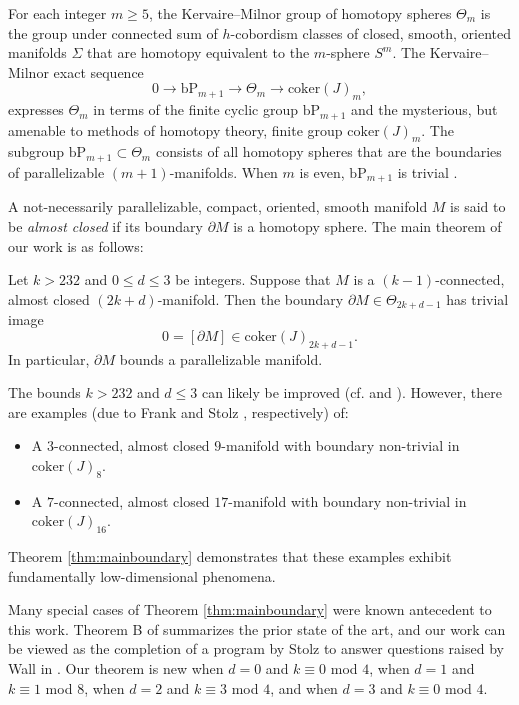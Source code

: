 For each integer $m \ge 5$, the Kervaire--Milnor \cite{KervaireMilnor} group of homotopy spheres $\Theta_{m}$ is the group under connected sum of $h$-cobordism classes of closed, smooth, oriented manifolds $\Sigma$ that are homotopy equivalent to the $m$-sphere $S^{m}$.  The Kervaire--Milnor exact sequence
$$0 \to \mathrm{bP}_{m+1} \to \Theta_{m} \to \mathrm{coker}(J)_{m},$$
expresses $\Theta_{m}$ in terms of the finite cyclic group $\mathrm{bP}_{m+1}$ and the mysterious, but amenable to methods of homotopy theory, finite group $\mathrm{coker}(J)_{m}$.  The subgroup $\mathrm{bP}_{m+1} \subset \Theta_{m}$ consists of all homotopy spheres that are the boundaries of parallelizable $(m+1)$-manifolds.  When $m$ is even, $\mathrm{bP}_{m+1}$ is trivial \cite[Theorem 5.1]{KervaireMilnor}.

A not-necessarily parallelizable, compact, oriented, smooth manifold $M$ is said to be \emph{almost closed} if its boundary $\partial M$ is a homotopy sphere.  The main theorem of our work is as follows:

\begin{thm} \label{thm:mainboundary}
Let $k>232$ and $0 \le d \le 3$ be integers.  Suppose that $M$ is a $(k-1)$-connected, almost closed $(2k+d)$-manifold.  Then the boundary 
$\partial M \in \Theta_{2k+d-1}$ has trivial image $$0=[\partial M] \in \mathrm{coker}(J)_{2k+d-1}.$$  In particular, $\partial M$ bounds a parallelizable manifold.
\end{thm}

\begin{rmk}
The bounds $k>232$ and $d \le 3$ can likely be improved (cf.  and ).  However, there are examples (due to Frank \cite[Example 1]{Frank} and Stolz \cite[Satz 12.1]{StolzBook}, respectively) of:
\begin{itemize}
 \item A $3$-connected, almost closed $9$-manifold with boundary non-trivial in $\mathrm{coker}(J)_8$.
 \item A $7$-connected, almost closed $17$-manifold with boundary non-trivial in $\mathrm{coker}(J)_{16}$.
\end{itemize}
Theorem \ref{thm:mainboundary} demonstrates that these examples exhibit fundamentally low-dimensional phenomena.
\end{rmk}

\begin{rmk}
Many special cases of Theorem \ref{thm:mainboundary} were known antecedent to this work. 
Theorem B of \cite{StolzBook} summarizes the prior state of the art, and our work can be viewed as the completion of a program by Stolz to answer questions raised by Wall in \cite{Wall62,Wall67}.  Our theorem is new when $d=0$ and $k \equiv 0$ mod $4$, when $d=1$ and $k \equiv 1$ mod $8$, when $d=2$ and $k \equiv 3$ mod $4$, and when $d=3$ and $k \equiv 0$ mod $4$.
\end{rmk}

